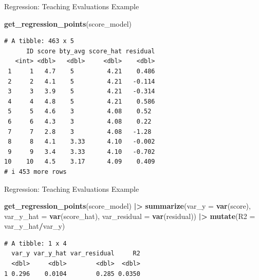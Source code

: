 \documentclass[
  ignorenonframetext,
]{beamer}
\newenvironment{Shaded}{\begin{snugshade}}{\end{snugshade}}
\newcommand{\AttributeTok}[1]{\textcolor[rgb]{0.13,0.29,0.53}{#1}}
\newcommand{\FunctionTok}[1]{\textcolor[rgb]{0.13,0.29,0.53}{\textbf{#1}}}
\newcommand{\NormalTok}[1]{#1}
\newcommand{\SpecialCharTok}[1]{\textcolor[rgb]{0.81,0.36,0.00}{\textbf{#1}}}
\begin{document}
\begin{frame}[fragile]{Regression: Teaching Evaluations Example}
\label{regression-teaching-evaluations-example-15}
\normalsize

\begin{Shaded}
\begin{Highlighting}[]
\FunctionTok{get\_regression\_points}\NormalTok{(score\_model) }
\end{Highlighting}
\end{Shaded}

\begin{verbatim}
# A tibble: 463 x 5
      ID score bty_avg score_hat residual
   <int> <dbl>   <dbl>     <dbl>    <dbl>
 1     1   4.7    5         4.21    0.486
 2     2   4.1    5         4.21   -0.114
 3     3   3.9    5         4.21   -0.314
 4     4   4.8    5         4.21    0.586
 5     5   4.6    3         4.08    0.52 
 6     6   4.3    3         4.08    0.22 
 7     7   2.8    3         4.08   -1.28 
 8     8   4.1    3.33      4.10   -0.002
 9     9   3.4    3.33      4.10   -0.702
10    10   4.5    3.17      4.09    0.409
# i 453 more rows
\end{verbatim}
\end{frame}

\begin{frame}[fragile]{Regression: Teaching Evaluations Example}
\label{regression-teaching-evaluations-example-16}
\small

\begin{Shaded}
\begin{Highlighting}[]
\FunctionTok{get\_regression\_points}\NormalTok{(score\_model) }\SpecialCharTok{|\textgreater{}} 
  \FunctionTok{summarize}\NormalTok{(}\AttributeTok{var\_y =} \FunctionTok{var}\NormalTok{(score), }
            \AttributeTok{var\_y\_hat =} \FunctionTok{var}\NormalTok{(score\_hat), }
            \AttributeTok{var\_residual =} \FunctionTok{var}\NormalTok{(residual)) }\SpecialCharTok{|\textgreater{}} 
  \FunctionTok{mutate}\NormalTok{(}\AttributeTok{R2 =}\NormalTok{ var\_y\_hat}\SpecialCharTok{/}\NormalTok{var\_y)}
\end{Highlighting}
\end{Shaded}

\begin{verbatim}
# A tibble: 1 x 4
  var_y var_y_hat var_residual     R2
  <dbl>     <dbl>        <dbl>  <dbl>
1 0.296    0.0104        0.285 0.0350
\end{verbatim}
\end{frame}
\end{document}
